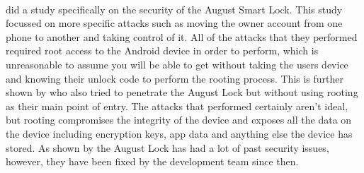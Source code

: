 \documentclass[10pt, a4paper]{article}
\begin{document}
\\
\indent\cite{Ye2017} did a study specifically on the security of the August Smart Lock. This study focussed on more specific attacks such as moving the owner account from one phone to another and taking control of it. All of the attacks that they performed required root access to the Android device in order to perform, which is unreasonable to assume you will be able to get without taking the users device and knowing their unlock code to perform the rooting process. This is further shown by \cite{Fuller2017} who also tried to penetrate the August Lock but without using rooting as their main point of entry. The attacks that \cite{Ye2017} performed certainly aren't ideal, but rooting compromises the integrity of the device and exposes all the data on the device including encryption keys, app data and anything else the device has stored. As shown by \cite{Fuller2017} the August Lock has had a lot of past security issues, however, they have been fixed by the development team since then.
\end{document}
